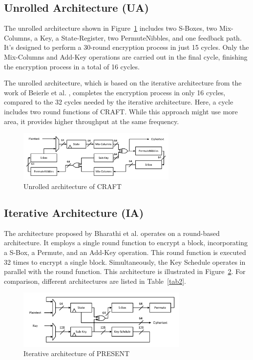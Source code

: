 \documentclass[final,5p,times,twocolumn]{elsarticle}
\begin{document}
\subsection{Unrolled Architecture (UA)}\label{subsec3}

The unrolled architecture shown in Figure~\ref{fig4} includes two S-Boxes, two Mix-Columns, a Key, a State-Register, two PermuteNibbles, and one feedback path. It's designed to perform a 30-round encryption process in just 15 cycles. Only the Mix-Columns and Add-Key operations are carried out in the final cycle, finishing the encryption process in a total of 16 cycles.

The unrolled architecture, which is based on the iterative architecture from the work of Beierle et al. \cite{Beierle2019}, completes the encryption process in only 16 cycles, compared to the 32 cycles needed by the iterative architecture. Here, a cycle includes two round functions of CRAFT. While this approach might use more area, it provides higher throughput at the same frequency.


\begin{figure}[h]%
    \centering
    \includegraphics[width=0.7\textwidth]{./fig/unrolled-archticture.pdf}
    \caption{Unrolled architecture of CRAFT}\label{fig4}
\end{figure}

\subsection{Iterative Architecture (IA)}\label{iterative_architecture}

The architecture proposed by Bharathi et al. \cite{Bharathi2022} operates on a round-based architecture.
It employs a single round function to encrypt a block, incorporating a S-Box, a Permute, and an Add-Key operation.
This round function is executed 32 times to encrypt a single block. Simultaneously, the Key Schedule operates in parallel with the round function. This architecture is illustrated in Figure~\ref{fig5}.
For comparison, different architectures are listed in Table~\ref{tab2}.

\begin{figure}
    \centering
    \includegraphics[width=0.75\textwidth]{./fig/iteration-present.pdf}
    \caption{Iterative architecture of PRESENT}\label{fig5}
\end{figure}
\end{document}
